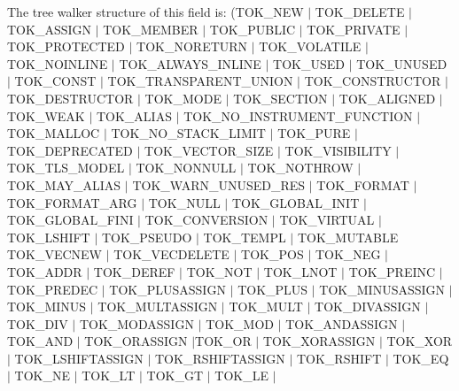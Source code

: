 The tree walker structure of this field is\+: (T\+O\+K\+\_\+\+N\+EW $\vert$ T\+O\+K\+\_\+\+D\+E\+L\+E\+TE $\vert$ T\+O\+K\+\_\+\+A\+S\+S\+I\+GN $\vert$ T\+O\+K\+\_\+\+M\+E\+M\+B\+ER $\vert$ T\+O\+K\+\_\+\+P\+U\+B\+L\+IC $\vert$ T\+O\+K\+\_\+\+P\+R\+I\+V\+A\+TE $\vert$ T\+O\+K\+\_\+\+P\+R\+O\+T\+E\+C\+T\+ED $\vert$ T\+O\+K\+\_\+\+N\+O\+R\+E\+T\+U\+RN $\vert$ T\+O\+K\+\_\+\+V\+O\+L\+A\+T\+I\+LE $\vert$ T\+O\+K\+\_\+\+N\+O\+I\+N\+L\+I\+NE $\vert$ T\+O\+K\+\_\+\+A\+L\+W\+A\+Y\+S\+\_\+\+I\+N\+L\+I\+NE $\vert$ T\+O\+K\+\_\+\+U\+S\+ED $\vert$ T\+O\+K\+\_\+\+U\+N\+U\+S\+ED $\vert$ T\+O\+K\+\_\+\+C\+O\+N\+ST $\vert$ T\+O\+K\+\_\+\+T\+R\+A\+N\+S\+P\+A\+R\+E\+N\+T\+\_\+\+U\+N\+I\+ON $\vert$ T\+O\+K\+\_\+\+C\+O\+N\+S\+T\+R\+U\+C\+T\+OR $\vert$ T\+O\+K\+\_\+\+D\+E\+S\+T\+R\+U\+C\+T\+OR $\vert$ T\+O\+K\+\_\+\+M\+O\+DE $\vert$ T\+O\+K\+\_\+\+S\+E\+C\+T\+I\+ON $\vert$ T\+O\+K\+\_\+\+A\+L\+I\+G\+N\+ED $\vert$ T\+O\+K\+\_\+\+W\+E\+AK $\vert$ T\+O\+K\+\_\+\+A\+L\+I\+AS $\vert$ T\+O\+K\+\_\+\+N\+O\+\_\+\+I\+N\+S\+T\+R\+U\+M\+E\+N\+T\+\_\+\+F\+U\+N\+C\+T\+I\+ON $\vert$ T\+O\+K\+\_\+\+M\+A\+L\+L\+OC $\vert$ T\+O\+K\+\_\+\+N\+O\+\_\+\+S\+T\+A\+C\+K\+\_\+\+L\+I\+M\+IT $\vert$ T\+O\+K\+\_\+\+P\+U\+RE $\vert$ T\+O\+K\+\_\+\+D\+E\+P\+R\+E\+C\+A\+T\+ED $\vert$ T\+O\+K\+\_\+\+V\+E\+C\+T\+O\+R\+\_\+\+S\+I\+ZE $\vert$ T\+O\+K\+\_\+\+V\+I\+S\+I\+B\+I\+L\+I\+TY $\vert$ T\+O\+K\+\_\+\+T\+L\+S\+\_\+\+M\+O\+D\+EL $\vert$ T\+O\+K\+\_\+\+N\+O\+N\+N\+U\+LL $\vert$ T\+O\+K\+\_\+\+N\+O\+T\+H\+R\+OW $\vert$ T\+O\+K\+\_\+\+M\+A\+Y\+\_\+\+A\+L\+I\+AS $\vert$ T\+O\+K\+\_\+\+W\+A\+R\+N\+\_\+\+U\+N\+U\+S\+E\+D\+\_\+\+R\+ES $\vert$ T\+O\+K\+\_\+\+F\+O\+R\+M\+AT $\vert$ T\+O\+K\+\_\+\+F\+O\+R\+M\+A\+T\+\_\+\+A\+RG $\vert$ T\+O\+K\+\_\+\+N\+U\+LL $\vert$ T\+O\+K\+\_\+\+G\+L\+O\+B\+A\+L\+\_\+\+I\+N\+IT $\vert$ T\+O\+K\+\_\+\+G\+L\+O\+B\+A\+L\+\_\+\+F\+I\+NI $\vert$ T\+O\+K\+\_\+\+C\+O\+N\+V\+E\+R\+S\+I\+ON $\vert$ T\+O\+K\+\_\+\+V\+I\+R\+T\+U\+AL $\vert$ T\+O\+K\+\_\+\+L\+S\+H\+I\+FT $\vert$ T\+O\+K\+\_\+\+P\+S\+E\+U\+DO $\vert$ T\+O\+K\+\_\+\+T\+E\+M\+PL $\vert$ T\+O\+K\+\_\+\+M\+U\+T\+A\+B\+LE T\+O\+K\+\_\+\+V\+E\+C\+N\+EW $\vert$ T\+O\+K\+\_\+\+V\+E\+C\+D\+E\+L\+E\+TE $\vert$ T\+O\+K\+\_\+\+P\+OS $\vert$ T\+O\+K\+\_\+\+N\+EG $\vert$ T\+O\+K\+\_\+\+A\+D\+DR $\vert$ T\+O\+K\+\_\+\+D\+E\+R\+EF $\vert$ T\+O\+K\+\_\+\+N\+OT $\vert$ T\+O\+K\+\_\+\+L\+N\+OT $\vert$ T\+O\+K\+\_\+\+P\+R\+E\+I\+NC $\vert$ T\+O\+K\+\_\+\+P\+R\+E\+D\+EC $\vert$ T\+O\+K\+\_\+\+P\+L\+U\+S\+A\+S\+S\+I\+GN $\vert$ T\+O\+K\+\_\+\+P\+L\+US $\vert$ T\+O\+K\+\_\+\+M\+I\+N\+U\+S\+A\+S\+S\+I\+GN $\vert$ T\+O\+K\+\_\+\+M\+I\+N\+US $\vert$ T\+O\+K\+\_\+\+M\+U\+L\+T\+A\+S\+S\+I\+GN $\vert$ T\+O\+K\+\_\+\+M\+U\+LT $\vert$ T\+O\+K\+\_\+\+D\+I\+V\+A\+S\+S\+I\+GN $\vert$ T\+O\+K\+\_\+\+D\+IV $\vert$ T\+O\+K\+\_\+\+M\+O\+D\+A\+S\+S\+I\+GN $\vert$ T\+O\+K\+\_\+\+M\+OD $\vert$ T\+O\+K\+\_\+\+A\+N\+D\+A\+S\+S\+I\+GN $\vert$ T\+O\+K\+\_\+\+A\+ND $\vert$ T\+O\+K\+\_\+\+O\+R\+A\+S\+S\+I\+GN $\vert$\+T\+O\+K\+\_\+\+OR $\vert$ T\+O\+K\+\_\+\+X\+O\+R\+A\+S\+S\+I\+GN $\vert$ T\+O\+K\+\_\+\+X\+OR $\vert$ T\+O\+K\+\_\+\+L\+S\+H\+I\+F\+T\+A\+S\+S\+I\+GN $\vert$ T\+O\+K\+\_\+\+R\+S\+H\+I\+F\+T\+A\+S\+S\+I\+GN $\vert$ T\+O\+K\+\_\+\+R\+S\+H\+I\+FT $\vert$ T\+O\+K\+\_\+\+EQ $\vert$ T\+O\+K\+\_\+\+NE $\vert$ T\+O\+K\+\_\+\+LT $\vert$ T\+O\+K\+\_\+\+GT $\vert$ T\+O\+K\+\_\+\+LE $\vert$ 